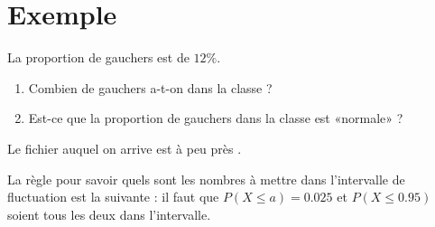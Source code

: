 \section{Exemple}

La proportion de gauchers est de \( 12\%\).
\begin{enumerate}
    \item
        Combien de gauchers a-t-on dans la classe ?
    \item
        Est-ce que la proportion de gauchers dans la classe est «normale» ?
\end{enumerate}
Le fichier auquel on arrive est à peu près .

\begin{Aretenir}
    La règle pour savoir quels sont les nombres à mettre dans l'intervalle de fluctuation est la suivante : il faut que \( P(X\leq a)=0.025\) et \( P(X\leq 0.95)\) soient tous les deux dans l'intervalle.
\end{Aretenir}
